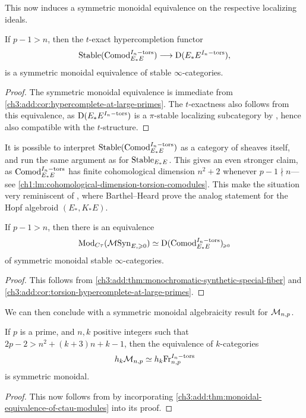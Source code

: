 This now induces a symmetric monoidal equivalence on the respective localizing ideals. 

\begin{corollary}
    \label{ch3:add:cor:torsion-hypercomplete-at-large-primes}
    If $p-1> n$, then the $t$-exact hypercompletion functor
    \[\mathrm{Stable}(\mathrm{Comod}_{E_*E}^{I_n-\mathrm{tors}}) \longrightarrow \mathrm{D}(E_*E^{I_n-\mathrm{tors}}),\]
    is a symmetric monoidal equivalence of stable $\infty$-categories.  
\end{corollary}
\begin{proof}
    The symmetric monoidal equivalence is immediate from \cref{ch3:add:cor:hypercomplete-at-large-primes}. The $t$-exactness also follows from this equivalence, as $\mathrm{D}(E_*E^{I_n-\mathrm{tors}})$ is a $\pi$-stable localizing subcategory by \cite[3.7(2)]{barthel-heard-valenzuela_2020}, hence also compatible with the $t$-structure. 
\end{proof}

\begin{remark}
    It is possible to interpret $\mathrm{Stable}(\mathrm{Comod}_{E_*E}^{I_n-\mathrm{tors}})$ as a category of sheaves itself, and run the same argument as for $\mathrm{Stable}_{E_*E}$. This gives an even stronger claim, as $\mathrm{Comod}_{E_*E}^{I_n-\mathrm{tors}}$ has finite cohomological dimension $n^2+2$ whenever $p-1\nmid n$---see \cref{ch1:lm:cohomological-dimension-torsion-comodules}. This make the situation very reminiscent of \cite[4.7]{barthel-heard_2018}, where Barthel--Heard prove the analog statement for the Hopf algebroid $(E_*, K_*E)$. 
\end{remark}

\begin{theorem}
    \label{ch3:add:thm:monoidal-equivalence-of-ctau-modules}
    If $p-1>n$, then there is an equivalence 
    \[\mathrm{Mod}_{C\tau}(\mathcal{M}\mathrm{Syn}_{E, \geqslant 0}) \simeq \mathrm{D}(\mathrm{Comod}_{E_*E}^{I_n-\mathrm{tors}})_{\hspace{-1pt}\scriptscriptstyle\geqslant 0}\]
    of symmetric monoidal stable $\infty$-categories. 
\end{theorem}
\begin{proof}
    This follows from \cref{ch3:add:thm:monochromatic-synthetic-special-fiber} and \cref{ch3:add:cor:torsion-hypercomplete-at-large-primes}. 
\end{proof}

We can then conclude with a symmetric monoidal algebraicity result for $\mathcal{M}_{n,p}$. 

\begin{theorem}
    \label{ch3:add:thm:monochromatic-monoidally-algebraic}
    If $p$ is a prime, and $n, k$ positive integers such that $2p-2>n^2+(k+3)n+k-1$, then the equivalence of $k$-categories
    \[h_k \mathcal{M}_{n,p}\simeq h_k \mathrm{Fr}_{n,p}^{I_n-\mathrm{tors}}\]
    is symmetric monoidal. 
\end{theorem}
\begin{proof}
    This now follows from \cite[Theorem H]{barkan_2023} by incorporating \cref{ch3:add:thm:monoidal-equivalence-of-ctau-modules} into its proof. 
\end{proof}

